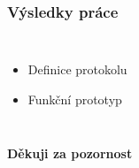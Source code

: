 \begin{frame}
  \frametitle{Výsledky práce}
  \begin{columns}
    \begin{itemize}
      \item Definice protokolu
      \item Funkční prototyp
    \end{itemize}
    
  \end{columns}
\end{frame}





\begin{frame}
  \begin{center}
    \Huge\textbf{Děkuji za pozornost}
  \end{center}
\end{frame}




